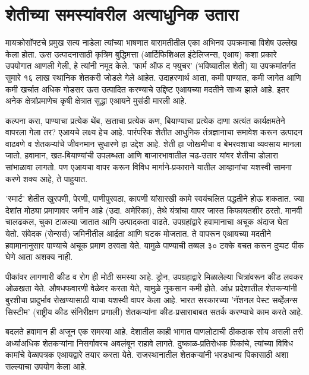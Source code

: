 \chapter{शेतीच्या समस्यांवरील अत्याधुनिक उतारा}

मायक्रोसॉफ्टचे प्रमुख सत्य नाडेला त्यांच्या भाषणात बारामतीतील एका अभिनव उपक्रमाचा विशेष उल्लेख केला होता. ऊस उत्पादनासाठी कृत्रिम बुद्धिमत्ता (आर्टिफिशिअल इंटेलिजन्स, एआय) कशा प्रकारे उपयोगात आणली गेली, हे त्यांनी नमूद केले. 'फार्म ऑफ द फ्युचर' (भविष्यातील शेती) या उपक्रमांतर्गत सुमारे १६ लाख स्थानिक शेतकरी जोडले गेले आहेत. उदाहरणार्थ आता, कमी पाण्यात, कमी जागेत आणि कमी खर्चात अधिक गोडसर ऊस उत्पादित करण्याचे उद्दिष्ट एआयच्या मदतीने साध्य झाले आहे. इतर अनेक क्षेत्रांप्रमाणेच कृषी क्षेत्रात सुद्धा एआयने मुसंडी मारली आहे.

कल्पना करा, पाण्याचा प्रत्येक थेंब, खताचा प्रत्येक कण, बियाण्याचा प्रत्येक दाणा अत्यंत कार्यक्षमतेने वापरला गेला तर? एआयचे लक्ष्य हेच आहे. पारंपरिक शेतीत आधुनिक तंत्रज्ञानाचा समावेश करून उत्पादन वाढवणे व शेतकऱ्यांचे जीवनमान सुधारणे हा उद्देश आहे. शेती हा जोखमीचा व बेभरवशाचा व्यवसाय मानला जातो. हवामान, खत-बियाण्यांची उपलब्धता आणि बाजारभावातील चढ-उतार यांवर शेतीचा डोलारा सांभाळावा लागतो. पण एआयचा वापर करून विविध मार्गाने-प्रकाराने यातील  आव्हानांचा यशस्वी सामना करणे शक्य आहे, ते पाहुयात.

'स्मार्ट' शेतीत खुरपणी, पेरणी, पाणीपुरवठा, कापणी यांसारखी कामे स्वयंचलित पद्धतीने होऊ शकतात. ज्या देशांत मोठ्या प्रमाणावर जमीन आहे (उदा. अमेरिका), तेथे यंत्रांचा वापर जास्त किफायतशीर ठरतो. मानवी चालढकल, चुका टाळल्या जातात आणि उत्पादकता वाढते. उपग्रहांद्वारे हवामानाचा अचूक अंदाज घेता येतो. संवेदक (सेन्सर्स) जमिनीतील आर्द्रता आणि घटक मोजतात. ते वापरून एआयच्या मदतीने हवामानानुसार पाण्याचे अचूक प्रमाण ठरवता येते. यामुळे पाण्याची तब्बल ३० टक्के बचत करून दुप्पट पीक घेणे आता अशक्य नाही.

पीकांवर लागणारी कीड व रोग ही मोठी समस्या आहे. ड्रोन, उपग्रहाद्वारे मिळालेल्या चित्रांवरून कीड लवकर ओळखता येते. औषधफवारणी वेळेवर करता येते, यामुळे नुकसान कमी होते. आंध्र प्रदेशातील शेतकऱ्यांनी बुरशीचा प्रादुर्भाव रोखण्यासाठी याचा यशस्वी वापर केला आहे. भारत सरकारच्या 'नॅशनल पेस्ट सर्व्हेलन्स सिस्टीम' (राष्ट्रीय कीड संनिरीक्षण प्रणाली) शेतकऱ्यांना कीड-प्रसाराबाबत सतर्क करण्याचे काम करते आहे.

बदलते हवामान ही अजून एक समस्या आहे. देशातील काही भागात पाणलोटाची ठीकठाक सोय असली तरी अर्ध्याअधिक शेतकऱ्यांना निसर्गावरच अवलंबून राहावे लागते. दुष्काळ-प्रतिरोधक पिकांचे, त्यांच्या विविध कामांचे वेळापत्रक एआयद्वारे तयार करता येते. राजस्थानातील शेतकऱ्यांनी भरडधान्य पिकासाठी अशा सल्ल्याचा उपयोग केला आहे.

